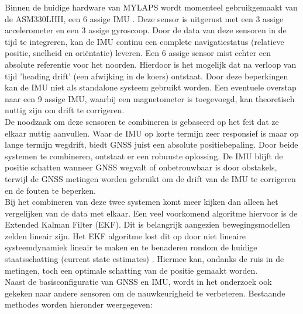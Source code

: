 Binnen de huidige hardware van MYLAPS wordt momenteel gebruikgemaakt van de ASM330LHH, een 6 assige IMU \cite{stmicro_asm330lhh}. Deze sensor is uitgerust met een 3 assige accelerometer en een 3 assige gyroscoop. Door de data van deze sensoren in de tijd te integreren, kan de IMU continu een complete navigatiestatus (relatieve positie, snelheid en oriëntatie) leveren. Een 6 assige sensor mist echter een absolute referentie voor het noorden. Hierdoor is het mogelijk dat na verloop van tijd 'heading drift' (een afwijking in de koers) ontstaat. Door deze beperkingen kan de IMU niet als standalone systeem gebruikt worden. Een eventuele overstap naar een 9 assige IMU, waarbij een magnetometer is toegevoegd, kan theoretisch nuttig zijn om drift te corrigeren. \\

De noodzaak om deze sensoren te combineren is gebaseerd op het feit dat ze elkaar nuttig aanvullen. Waar de IMU op korte termijn zeer responsief is maar op lange termijn wegdrift, biedt GNSS juist een absolute positiebepaling. Door beide systemen te combineren, ontstaat er een robuuste oplossing. De IMU blijft de positie schatten wanneer GNSS wegvalt of onbetrouwbaar is door obstakels, terwijl de GNSS metingen worden gebruikt om de drift van de IMU te corrigeren en de fouten te beperken. \\

Bij het combineren van deze twee systemen komt meer kijken dan alleen het vergelijken van de data met elkaar. Een veel voorkomend algoritme hiervoor is de Extended Kalman Filter (EKF). Dit is belangrijk aangezien bewegingsmodellen zelden lineair zijn. Het EKF algoritme lost dit op door niet lineaire systeemdynamiek lineair te maken en te benaderen rondom de huidige staatsschatting (current state estimates) \cite{Meng2017RobustLocalization}. Hiermee kan, ondanks de ruis in de metingen, toch een optimale schatting van de positie gemaakt worden. \\

Naast de basisconfiguratie van GNSS en IMU, wordt in het onderzoek ook gekeken naar andere sensoren om de nauwkeurigheid te verbeteren. Bestaande methodes worden hieronder weergegeven:

